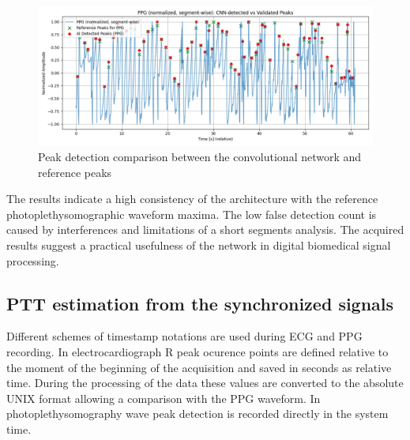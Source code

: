 \documentclass[journal]{IEEEtran}
\begin{document}
\begin{figure}[htbp]
    \centering
    \includegraphics[scale=0.28]{ppg_ai_vs_real.png}
    \caption{Peak detection comparison between the convolutional network and reference peaks}
    \label{fig:ppg_ai_real_peaks}
\end{figure}

\newpage
The results indicate a high consistency of the architecture with the reference photoplethysomographic waveform maxima. The low false detection count is caused by interferences and limitations of a short segments analysis. The acquired results suggest a practical usefulness of the network in digital biomedical signal processing.


\subsection{PTT estimation from the synchronized signals}
Different schemes of timestamp notations are used during ECG and PPG recording. In electrocardiograph R peak ocurence points are defined relative to the moment of the beginning of the acquisition and saved in seconds as relative time. During the processing of the data these values are converted to the absolute UNIX format allowing a comparison with the PPG waveform. In photoplethysomography wave peak detection is recorded directly in the system time.
\end{document}
